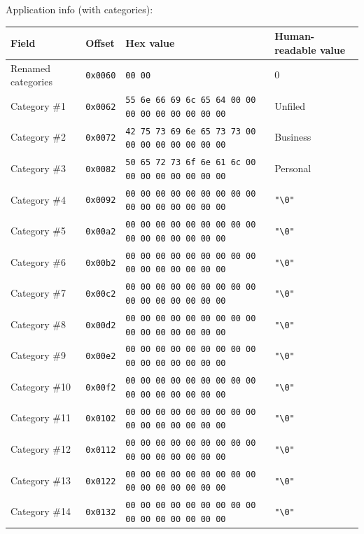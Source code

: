 \documentclass[a4paper,12pt,oneside]{scrartcl}
\begin{document}
Application info (with categories):
\begin{longtable}{|p{3cm}|l|p{3cm}|p{5cm}|}
  \hline
  \textbf{Field} & \textbf{Offset} & \textbf{Hex value} & \textbf{Human-readable value} \\
  \hline
  Renamed categories & \texttt{0x0060} & \texttt{00 00} & 0 \\
  \hline
  Category \#1 & \texttt{0x0062} & \texttt{55 6e 66 69 6c 65 64 00 00 00 00 00 00 00 00 00} & Unfiled \\
  \hline
  Category \#2 & \texttt{0x0072} & \texttt{42 75 73 69 6e 65 73 73 00 00 00 00 00 00 00 00} & Business \\
  \hline
  Category \#3 & \texttt{0x0082} & \texttt{50 65 72 73 6f 6e 61 6c 00 00 00 00 00 00 00 00} & Personal \\
  \hline
  Category \#4 & \texttt{0x0092} & \texttt{00 00 00 00 00 00 00 00 00 00 00 00 00 00 00 00} & \texttt{"\textbackslash{}0"} \\
  \hline
  Category \#5 & \texttt{0x00a2} & \texttt{00 00 00 00 00 00 00 00 00 00 00 00 00 00 00 00} & \texttt{"\textbackslash{}0"} \\
  \hline
  Category \#6 & \texttt{0x00b2} & \texttt{00 00 00 00 00 00 00 00 00 00 00 00 00 00 00 00} & \texttt{"\textbackslash{}0"} \\
  \hline
  Category \#7 & \texttt{0x00c2} & \texttt{00 00 00 00 00 00 00 00 00 00 00 00 00 00 00 00} & \texttt{"\textbackslash{}0"} \\
  \hline
  Category \#8 & \texttt{0x00d2} & \texttt{00 00 00 00 00 00 00 00 00 00 00 00 00 00 00 00} & \texttt{"\textbackslash{}0"} \\
  \hline
  Category \#9 & \texttt{0x00e2} & \texttt{00 00 00 00 00 00 00 00 00 00 00 00 00 00 00 00} & \texttt{"\textbackslash{}0"} \\
  \hline
  Category \#10 & \texttt{0x00f2} & \texttt{00 00 00 00 00 00 00 00 00 00 00 00 00 00 00 00} & \texttt{"\textbackslash{}0"} \\
  \hline
  Category \#11 & \texttt{0x0102} & \texttt{00 00 00 00 00 00 00 00 00 00 00 00 00 00 00 00} & \texttt{"\textbackslash{}0"} \\
  \hline
  Category \#12 & \texttt{0x0112} & \texttt{00 00 00 00 00 00 00 00 00 00 00 00 00 00 00 00} & \texttt{"\textbackslash{}0"} \\
  \hline
  Category \#13 & \texttt{0x0122} & \texttt{00 00 00 00 00 00 00 00 00 00 00 00 00 00 00 00} & \texttt{"\textbackslash{}0"} \\
  \hline
  Category \#14 & \texttt{0x0132} & \texttt{00 00 00 00 00 00 00 00 00 00 00 00 00 00 00 00} & \texttt{"\textbackslash{}0"} \\

\end{longtable}
\end{document}
